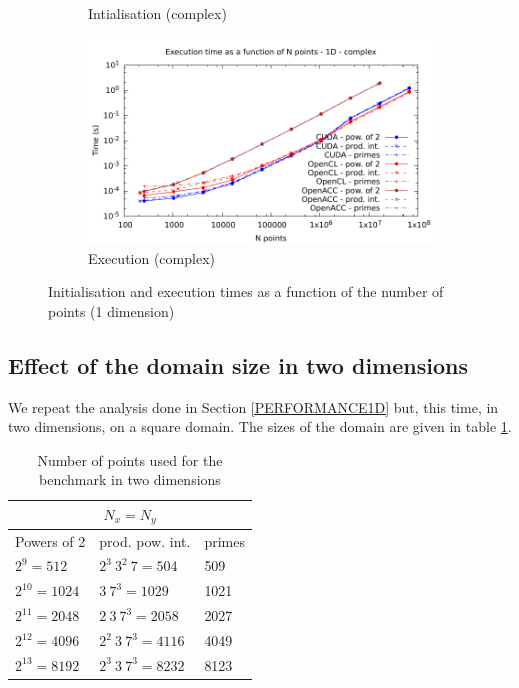 \documentclass[12pt, a4paper]{article}
\begin{document}
\begin{figure}[H]
\begin{subfigure}{.5\textwidth}
\caption{Intialisation (complex)}
\label{FFT1DCI}
\end{subfigure}%
\begin{subfigure}{.5\textwidth}
\centering
\includegraphics[width=.9\linewidth]{graphs/fft-1d-c-exec.pdf}
\caption{Execution (complex)}
\label{FFT1DCE}
\end{subfigure}
\caption{Initialisation and execution times as a function of the number of points (1 dimension)}
\label{FFT1D}
\end{figure}

\subsection{Effect of the domain size in two dimensions}\label{PERFORMANCE2D}
We repeat the analysis done in Section \ref{PERFORMANCE1D} but, this time, in two dimensions, on a square domain. The sizes of the domain are given in table \ref{2DSIZES}.

\begin{table}[H]
\centering
\begin{tabular}{|l|l|l|}
  \hline
  \multicolumn{3}{|c|}{$N_x=N_y$}\\
  \hline
  \hline
Powers of 2 & prod. pow. int. & primes\\ \hline
$2^9 = 512$ & $2^3\ 3^2\ 7 = 504$ & 509\\ \hline
$2^{10} = 1024$ & $3\ 7^3 = 1029$ & 1021\\ \hline
$2^{11} = 2048$	& $2\ 3 \ 7^3 = 2058$ &	2027\\ \hline
$2^{12} = 4096$	& $2^2\ 3\ 7^3 = 4116$ & 4049\\ \hline
$2^{13} = 8192$	& $2^3\ 3\ 7^3 = 8232$ & 8123\\ \hline
\end{tabular}
\caption{Number of points used for the benchmark in two dimensions}\label{2DSIZES}
\end{table}
\end{document}
